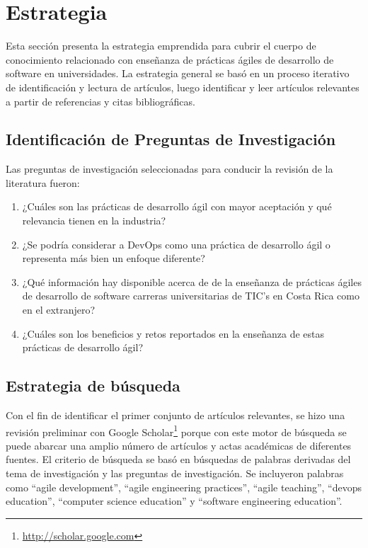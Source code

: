 \documentclass[journal]{IEEEtran}
\begin{document}
\section{Estrategia} \label{sec:estrategia}
Esta sección presenta la estrategia emprendida para cubrir el cuerpo de conocimiento relacionado con enseñanza de prácticas ágiles de desarrollo de software en universidades. La estrategia general se basó en un proceso iterativo de identificación y lectura de artículos, luego identificar y leer artículos relevantes a partir de referencias y citas bibliográficas.

\subsection{Identificación de Preguntas de Investigación}
Las preguntas de investigación seleccionadas para conducir la revisión de la literatura fueron:
\begin{enumerate}
    \item ¿Cuáles son las prácticas de desarrollo ágil con mayor aceptación y qué relevancia tienen en la industria?
    \item ¿Se podría considerar a DevOps como una práctica de desarrollo ágil o representa más bien un enfoque diferente?
    \item ¿Qué información hay disponible acerca de de la enseñanza de prácticas ágiles de desarrollo de software carreras universitarias de TIC's en Costa Rica como en el extranjero? 
    \item ¿Cuáles son los beneficios y retos reportados en la enseñanza de estas prácticas de desarrollo ágil?
\end{enumerate}

\subsection{Estrategia de búsqueda} \label{sec:estrategia-busqueda}
Con el fin de identificar el primer conjunto de artículos relevantes, se hizo una revisión preliminar con Google Scholar\footnote{\url{http://scholar.google.com}} porque con este motor de búsqueda se puede abarcar una amplio número de artículos y actas académicas de diferentes fuentes. El criterio de búsqueda se basó en búsquedas de palabras derivadas del tema de investigación y las preguntas de investigación. Se incluyeron palabras como ``agile development'', ``agile engineering practices'', ``agile teaching'', ``devops education'', ``computer science education'' y ``software engineering education''. 
\end{document}
